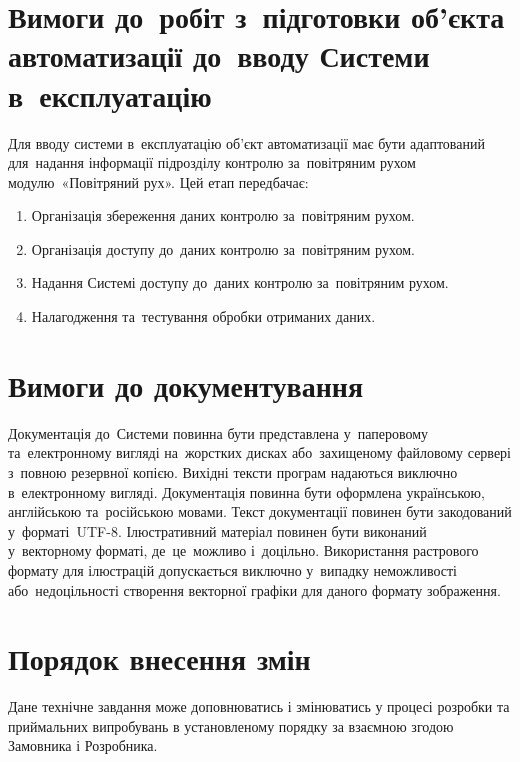 \documentclass[
	a4paper,
	oneside,
	BCOR = 10mm,
	DIV = 12,
	12pt,
	headings = normal,
]{scrartcl}
\newcommand{\allcaps}[1]{{\addfontfeatures{LetterSpace = 8, Kerning = Off}#1}}
\begin{document}
	\section{Вимоги до~робіт з~підготовки об'єкта автоматизації до~вводу Системи в~експлуатацію}
		Для вводу системи в~експлуатацію об'єкт автоматизації має бути адаптований для~надання інформації підрозділу контролю за~повітряним рухом модулю~«Повітряний рух». Цей етап передбачає:
		\begin{enumerate}[noitemsep]
			\item Організація збереження даних контролю за~повітряним рухом.
			\item Організація доступу до~даних контролю за~повітряним рухом.
			\item Надання Системі доступу до~даних контролю за~повітряним рухом.
			\item Налагодження та~тестування обробки отриманих даних.
		\end{enumerate}

	\section{Вимоги до документування}
		Документація до~Системи повинна бути представлена у~паперовому та~електронному вигляді на~жорстких дисках або~захищеному файловому сервері з~повною резервної копією. Вихідні тексти програм надаються виключно в~електронному вигляді. Документація повинна бути оформлена українською, англійською та~російською мовами.
		Текст документації повинен бути закодований у~форматі~\textenglish{\allcaps{UTF}}-8. Ілюстративний матеріал повинен бути виконаний у~векторному форматі, де~це~можливо і~доцільно. Використання растрового формату для ілюстрацій допускається виключно у~випадку неможливості або~недоцільності створення векторної графіки для даного формату зображення.

	\section{Порядок внесення змін}
		Дане технічне завдання може доповнюватись і змінюватись у процесі розробки та приймальних випробувань в установленому порядку за взаємною згодою Замовника і Розробника.
\end{document}
